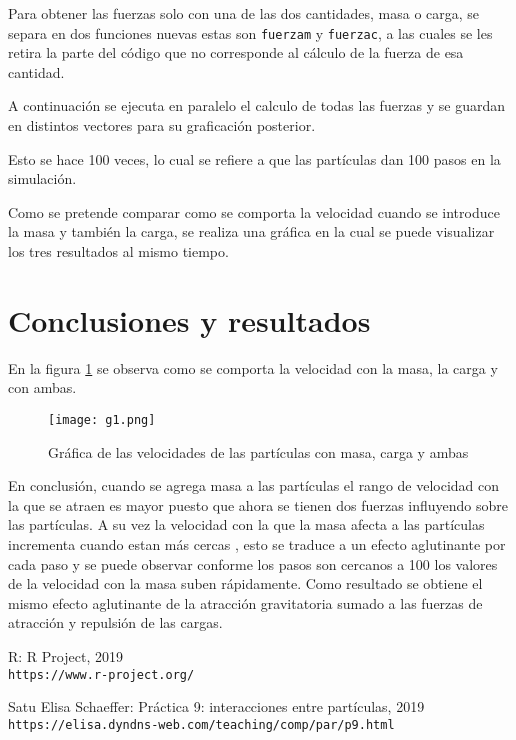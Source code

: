 \documentclass{article}
\begin{document}


Para obtener las fuerzas solo con una de las dos cantidades, masa o carga, se separa en dos funciones nuevas estas son \texttt{fuerzam} y \texttt{fuerzac}, a las cuales se les retira la parte del código que no corresponde al cálculo de la fuerza de esa cantidad.



A continuación se ejecuta en paralelo el calculo de todas las fuerzas y se guardan en distintos vectores para su graficación posterior.

Esto se hace 100 veces, lo cual se refiere a que las partículas dan 100 pasos en la simulación.


Como se pretende comparar como se comporta la velocidad cuando se introduce la masa y también la carga, se realiza una gráfica en la cual se puede visualizar los tres resultados al mismo tiempo.

\section{Conclusiones y resultados}
En la figura \ref{g1} se observa como se comporta la velocidad con la masa, la carga y con ambas.
\begin{figure}[H]
\centering
\texttt{[image: g1.png]}
\caption{Gráfica de las velocidades de las partículas con masa, carga y ambas}
\label{g1}
\end{figure}

En conclusión, cuando se agrega masa a las partículas el rango de velocidad con la que se atraen es mayor puesto que ahora se tienen dos fuerzas influyendo sobre las partículas.
A su vez la velocidad con la que la masa afecta a las partículas incrementa cuando estan más cercas , esto se traduce a un efecto aglutinante por cada paso y se puede observar conforme los pasos son cercanos a 100 los valores de la velocidad con la masa suben rápidamente.
Como resultado se obtiene el mismo efecto aglutinante de la atracción gravitatoria sumado a las fuerzas de atracción y repulsión de las cargas.




\begin{thebibliography}{9}

R:  R Project, 2019
\\\texttt{https://www.r-project.org/}

Satu Elisa Schaeffer: Práctica 9: interacciones entre partículas, 2019
\\\texttt{https://elisa.dyndns-web.com/teaching/comp/par/p9.html}



\end{thebibliography}
\end{document}

